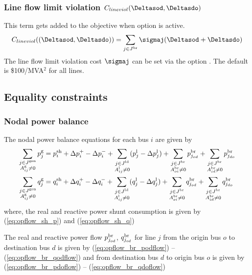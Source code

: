 \subsubsection{Line flow limit violation $C_{lineviol}(\Deltasod, \Deltasdo)$}
This term gets added to the objective when  \option{\opflowallowlineflowviolation} option is active. 
\begin{equation}
C_{lineviol}((\Deltasod, \Deltasdo)) =  \sum_{\jinJbr}{\sigmaj(\Deltasod + \Deltasdo)}
\label{eq:opf_obj_minlineviol}
\end{equation}
The line flow limit violation cost $\sigmaj$ can be set via the option
\option{\opflowlineflowviolationpenalty}. The default is \$100/MVA$^2$ for all lines.

\subsection{Equality constraints}\label{sec:opflow_eq}

\subsubsection{Nodal power balance}
The nodal power balance equations for each bus $i$ are given by
\begin{align}
\sum_{\substack{j \in J^\text{gen} \\ A^{\text{g}}_{ij} \neq 0}} p^\text{g}_j &=   p^{\text{sh}}_i + \Delta{p}^{+}_i - \Delta{p}^{-}_i + \sum_{\substack{j \in J^\text{ld} \\ A^{\text{l}}_{ij} \neq 0}} (p^{\text{l}}_j - \Delta{p}^{\text{l}}_j) + \sum_{\substack{j \in J^\text{br} \\ A^{\text{br}}_{oi} \neq 0}} p^\text{br}_{j_{od}} + \sum_{\substack{j \in J^\text{br} \\ A^{\text{br}}_{id} \neq 0}} p^\text{br}_{j_{do}} \\
\sum_{\substack{j \in J^\text{gen} \\ A^{\text{g}}_{ij} \neq 0}} q^\text{g}_j &=  q^{\text{sh}}_i + \Delta{q}^{+}_i - \Delta{q}^{-}_i + \sum_{\substack{j \in J^\text{ld} \\ A^{\text{l}}_{ij} \neq 0}} (q^{\text{l}}_j - \Delta{q}^{\text{l}}_j) +
\sum_{\substack{j \in J^\text{br} \\ A^{\text{br}}_{oi} \neq 0}} q^\text{br}_{j_{od}} + \sum_{\substack{j \in J^\text{br} \\ A^{\text{br}}_{id} \neq 0}} q^\text{br}_{j_{do}} \\
\end{align}
where, the real and reactive power shunt consumption is given by (\ref{eq:opflow_sh_p}) and (\ref{eq:opflow_sh_q})


The real and reactive power flow $p^\text{br}_{j_{od}}$, $q^\text{br}_{j_{od}}$ for line $j$ from the origin bus $o$ to destination bus $d$ is given by (\ref{eq:opflow_br_podflow}) -- 
 (\ref{eq:opflow_br_qodflow})
and from destination bus $d$ to origin bus $o$ is given by (\ref{eq:opflow_br_pdoflow}) -- 
 (\ref{eq:opflow_br_qdoflow})

